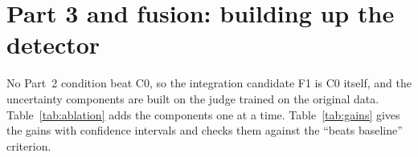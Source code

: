 \section{Part 3 and fusion: building up the detector}\label{sec:exp-ablation}

No Part~2 condition beat C0, so the integration candidate F1 is C0 itself, and the uncertainty components are built on the judge trained on the original data. Table~\ref{tab:ablation} adds the components one at a time. Table~\ref{tab:gains} gives the gains with confidence intervals and checks them against the ``beats baseline'' criterion.

\begin{table}[!htb]
    \centering
    \caption{Validation results as components are added (mean $\pm$ s.d.\ over three seeds). Each row adds one component to the row above it, except the probe alone. $^\dagger$Seed 42 only, built with the shared-task decoder; its reference is C0 under the same decoder (0.4269 / 0.4137).}
    \label{tab:ablation}
\end{table}

